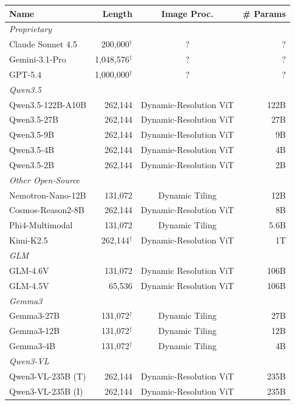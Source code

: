 \documentclass{llmxive}
\begin{document}
\begin{table}[!htbp]
\centering
\small
\begin{tabular}{lrcr}
\toprule
\textbf{Name} & \textbf{Length} & \textbf{Image Proc.} & \textbf{\# Params} \\
\midrule
\multicolumn{4}{l}{\textit{Proprietary}} \\
\midrule
Claude Sonnet 4.5 & 200,000$^\dagger$ & ? & ? \\
Gemini-3.1-Pro & 1,048,576$^\dagger$ & ? & ? \\
GPT-5.4 & 1,000,000$^\dagger$ & ? & ? \\
\midrule
\multicolumn{4}{l}{\textit{Qwen3.5}} \\
\midrule
Qwen3.5-122B-A10B & 262,144 & Dynamic-Resolution ViT & 122B \\
Qwen3.5-27B & 262,144 & Dynamic-Resolution ViT & 27B \\
Qwen3.5-9B & 262,144 & Dynamic-Resolution ViT & 9B \\
Qwen3.5-4B & 262,144 & Dynamic-Resolution ViT & 4B \\
Qwen3.5-2B & 262,144 & Dynamic-Resolution ViT & 2B \\
\midrule
\multicolumn{4}{l}{\textit{Other Open-Source}} \\
\midrule
Nemotron-Nano-12B & 131,072 & Dynamic Tiling & 12B \\
Cosmos-Reason2-8B & 262,144 & Dynamic-Resolution ViT & 8B \\
Phi4-Multimodal & 131,072 & Dynamic Tiling & 5.6B \\
Kimi-K2.5 & 262,144$^\dagger$ & Dynamic-Resolution ViT & 1T \\
\midrule
\multicolumn{4}{l}{\textit{GLM}} \\
\midrule
GLM-4.6V & 131,072 & Dynamic Resolution ViT & 106B \\
GLM-4.5V & 65,536 & Dynamic Resolution ViT & 106B \\
\midrule
\multicolumn{4}{l}{\textit{Gemma3}} \\
\midrule
Gemma3-27B & 131,072$^\dagger$ & Dynamic Tiling & 27B \\
Gemma3-12B & 131,072$^\dagger$ & Dynamic Tiling & 12B \\
Gemma3-4B & 131,072$^\dagger$ & Dynamic Tiling & 4B \\
\midrule
\multicolumn{4}{l}{\textit{Qwen3-VL}} \\
\midrule
Qwen3-VL-235B (T) & 262,144 & Dynamic-Resolution ViT & 235B \\
Qwen3-VL-235B (I) & 262,144 & Dynamic-Resolution ViT & 235B \\

\end{tabular}
\end{table}
\end{document}
